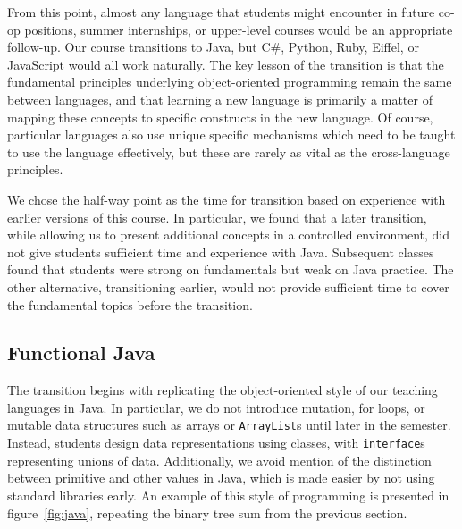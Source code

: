 \documentclass[submission,copyright]{eptcs}
\begin{document}
From this point, almost any language that students might encounter in
future co-op positions, summer internships, or upper-level courses
would be an appropriate follow-up.  Our course transitions to Java,
but C\#, Python, Ruby, Eiffel, or JavaScript would all work naturally.
The key lesson of the transition is that the fundamental principles
underlying object-oriented programming remain the same between
languages, and that learning a new language is primarily a matter of
mapping these concepts to specific constructs in the new language.  Of
course, particular languages also use unique specific mechanisms which
need to be taught to use the language effectively, but these are
rarely as vital as the cross-language principles.

We chose the half-way point as the time for transition based on
experience with earlier versions of this course. In particular, we
found that a later transition, while allowing us to present additional
concepts in a controlled environment, did not give students sufficient
time and experience with Java.  Subsequent classes found that students
were strong on fundamentals but weak on Java practice.  The other
alternative, transitioning earlier, would not provide sufficient time
to cover the fundamental topics before the transition.

\subsection{Functional Java}

The transition begins with replicating the object-oriented style of
our teaching languages in Java.  In particular, we do not introduce
mutation, for loops, or mutable data structures such as arrays or
\texttt{ArrayList}s until later in the semester.  Instead, students
design data representations using classes, with \texttt{interface}s
representing unions of data.  Additionally, we avoid mention of the
distinction between primitive and other values in Java, which is made
easier by not using standard libraries early.  An example of this
style of programming is presented in figure~\ref{fig:java}, repeating
the binary tree sum from the previous section.
\end{document}
